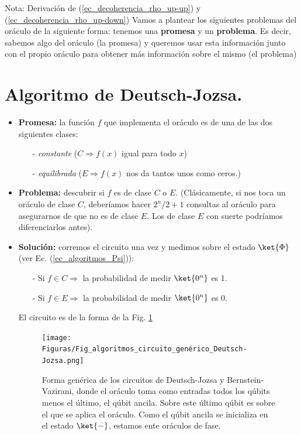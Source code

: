 \documentclass[a4paper,11pt]{book} %
\numberwithin{equation}{chapter}
\begin{document}
\begin{mybox_blue}{Nota: Derivación de (\ref{ec_decoherencia_rho_up-up}) y  (\ref{ec_decoherencia_rho_up-down})}
Vamos a plantear los siguientes problemas del oráculo de la siguiente forma: tenemos una \textbf{promesa} y un \textbf{problema}. Es decir, sabemos algo del oráculo (la promesa) y queremos usar esta información junto con el propio oráculo para obtener más información sobre el mismo (el problema)


	\section{Algoritmo de Deutsch-Jozsa.}

\begin{itemize}
	\item \textbf{Promesa:} la función $f$ que implementa el oráculo es de una de las dos siguientes clases: 
	\begin{itemize}
		\item[-] \textit{constante} ($C \Rightarrow f(x)$ igual para todo $x$)
		\item[-] \textit{equilibrada} ($E \Rightarrow f(x)$ nos da tantos unos como ceros.)
	\end{itemize}		
	
	\item \textbf{Problema:} descubrir si $f$ es de clase $C$ o $E$. (Clásicamente, si nos toca un oráculo de clase $C$, deberíamos hacer $2^n/2+1$ consultas al oráculo para asegurarnos de que no es de clase $E$. Los de clase $E$ con suerte podríamos diferenciarlos antes).
	
	\item \textbf{Solución:} corremos el circuito una vez y medimos sobre el estado $\ket{\Phi}$ (ver Ec. (\ref{ec_algoritmos_Psi})):
	\begin{itemize}
		\item[-] Si $f \in C \Rightarrow$ la probabilidad de medir $\ket{0^n}$ es 1.
		\item[-] Si $f \in E \Rightarrow$ la probabilidad de medir $\ket{0^n}$ es 0.
	\end{itemize}
	El circuito es de la forma de la Fig. \ref{Fig_algoritmos_circuito_genérico_Deutsch-Jozsa}
		\begin{figure}[h!]
		\centering 
		\texttt{[image: Figuras/Fig\_algoritmos\_circuito\_genérico\_Deutsch-Jozsa.png]}
		\caption{Forma genérica de los circuitos de Deutsch-Jozsa y Bernstein-Vazirani, donde el oráculo toma como entradas todos los qúbits 
		menos el último, el qúbit ancila. Sobre este último qúbit es sobre el que se aplica el oráculo. Como el qúbit ancila se inicializa en el 
		estado $\ket{-}$, estamos ente oráculos de fase.}
		\label{Fig_algoritmos_circuito_genérico_Deutsch-Jozsa}
		\end{figure}


\end{itemize}
\end{mybox_blue}
\end{document}
